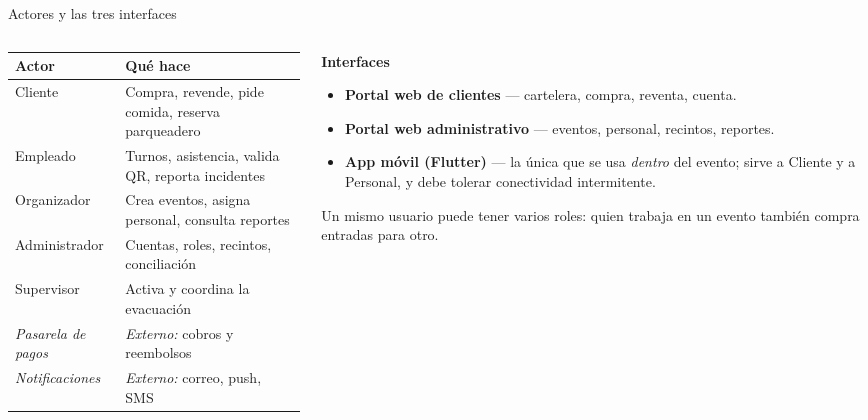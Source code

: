 \documentclass[aspectratio=169,10pt,xcolor={table}]{beamer}
\begin{document}
\begin{frame}{Actores y las tres interfaces}
  \begin{columns}[T]
    \begin{column}{0.54\textwidth}
      \footnotesize
      \begin{tabular}{L{2.2cm}L{4.6cm}}
        \toprule
        \textbf{Actor} & \textbf{Qué hace} \\
        \midrule
        Cliente & Compra, revende, pide comida, reserva parqueadero \\
        Empleado & Turnos, asistencia, valida QR, reporta incidentes \\
        Organizador & Crea eventos, asigna personal, consulta reportes \\
        Administrador & Cuentas, roles, recintos, conciliación \\
        Supervisor & Activa y coordina la evacuación \\
        \midrule
        \textit{Pasarela de pagos} & \textit{Externo:} cobros y reembolsos \\
        \textit{Notificaciones} & \textit{Externo:} correo, push, SMS \\
        \bottomrule
      \end{tabular}
    \end{column}
    \begin{column}{0.44\textwidth}
      \textbf{Interfaces}
      \begin{itemize}\small
        \item \textbf{Portal web de clientes} --- cartelera, compra, reventa, cuenta.
        \item \textbf{Portal web administrativo} --- eventos, personal, recintos, reportes.
        \item \textbf{App móvil (Flutter)} --- la única que se usa \textit{dentro} del evento;
              sirve a Cliente y a Personal, y debe tolerar conectividad intermitente.
      \end{itemize}
      \vspace{0.3em}
      \footnotesize
      Un mismo usuario puede tener varios roles: quien trabaja en un evento también compra
      entradas para otro.
    \end{column}
  \end{columns}
\end{frame}
\end{document}
